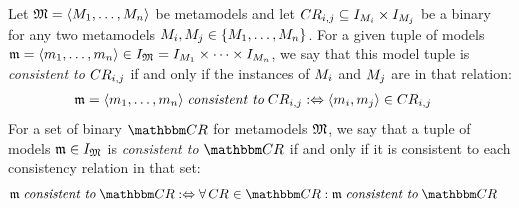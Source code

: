 \begin{definition}[Consistency]
    Let $\mathfrak{M} =  \langle M_{1}, \dots, M_{n} \rangle$ be metamodels and let $CR_{i,j} \subseteq I_{M_{i}} \times I_{M_{j}}$ be a binary \modellevelconsistencyrelation for any two metamodels $M_{i}, M_{j} \in \{ M_{1}, \dots, M_{n} \}$.
    For a given tuple of models $\mathfrak{m} = \langle m_{1}, \dots, m_{n} \rangle \in I_{\mathfrak{M}}{} = I_{M_{1}} \times \dots \times I_{M_{n}}$, we say that this model tuple is \emph{consistent to} $CR_{i,j}$ if and only if the instances of $M_{i}$ and $M_{j}$ are in that relation:
    \begin{align*} 
        &
        \modeltuple{m} = \tupled{\model{m}{1}, \dots, \model{m}{n}} \consistenttomath \consistencyrelation{CR}{i,j} \equivalentperdefinition %
        \tupled{\model{m}{i},\model{m}{j}} \in \consistencyrelation{CR}{i,j}
    \end{align*}
    For a set of binary \modellevelconsistencyrelations $\consistencyrelationset{CR}$ for metamodels $\mathfrak{M}$, we say that a tuple of models $\mathfrak{m} \in I_{\mathfrak{M}}{}$ is \emph{consistent to} $\consistencyrelationset{CR}$ if and only if it is consistent to each consistency relation in that set:
    \begin{align*} 
        &
        \modeltuple{m} \consistenttomath \consistencyrelationset{CR} \equivalentperdefinition %
        \forall \consistencyrelation{CR}{} \in \consistencyrelationset{CR} : \modeltuple{m} \consistenttomath \consistencyrelationset{CR}
    \end{align*}
\end{definition}

